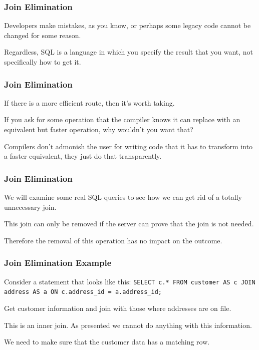 \begin{frame}
\frametitle{Join Elimination}

Developers make mistakes, as you know, or perhaps some legacy code cannot be changed for some reason. 

Regardless, SQL is a language in which you specify the result that you want, not specifically how to get it. 


\end{frame}

\begin{frame}
\frametitle{Join Elimination}

If there is a more efficient route, then it's worth taking.

If you ask for some operation that the compiler knows it can replace with an equivalent but faster operation, why wouldn't you want that? 

Compilers don't admonish the user for writing code that it has to transform into a faster equivalent, they just do that transparently.


\end{frame}


\begin{frame}
\frametitle{Join Elimination}

We will examine some real SQL queries to see how we can get rid of a totally unnecessary join.

This join can only be removed if the server can prove that the join is not needed.

Therefore the removal of this operation has no impact on the outcome.


\end{frame}

\begin{frame}
\frametitle{Join Elimination Example}

Consider a statement that looks like this: \texttt{SELECT c.* FROM customer AS c JOIN address AS a ON c.address\_id = a.address\_id;} 

Get customer information and join with those where addresses are on file. 

This is an inner join. As presented we cannot do anything with this information. 

We need to make sure that the customer data has a matching row.


\end{frame}

